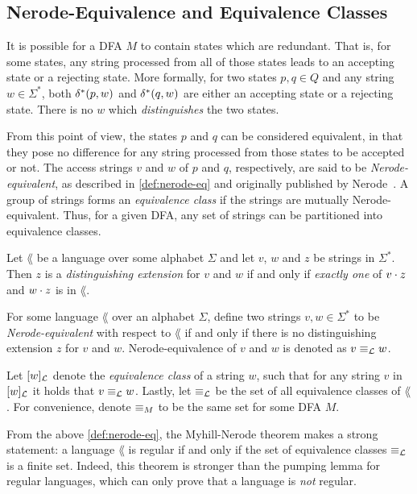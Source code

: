 \subsection{Nerode-Equivalence and Equivalence Classes}
\label{sec:nerode-equiv-equiv}
It is possible for a DFA $M$ to contain states which are redundant. That is, for
some states, any string processed from all of those states leads to an accepting
state or a rejecting state. More formally, for two states $p,q \in Q$ and any
string $w \in \Sigma^*$, both $\delta^*(p,w)$ and $\delta^*(q,w)$ are either an
accepting state or a rejecting state. There is no $w$ which
\textit{distinguishes} the two states.

From this point of view, the states $p$ and $q$ can be considered equivalent, in
that they pose no difference for any string processed from those states to be
accepted or not. The access strings $v$ and $w$ of $p$ and $q$, respectively,
are said to be \textit{Nerode-equivalent}, as described in \cref{def:nerode-eq}
and originally published by Nerode~\cite{Nerode1958}. A group of strings forms an
\textit{equivalence class} if the strings are mutually Nerode-equivalent. Thus,
for a given DFA, any set of strings can be partitioned into equivalence classes.

\begin{definition}\label{def:dist-ext}
  Let $\lang$ be a language over some alphabet $\Sigma$ and let $v$, $w$ and
  $z$ be strings in $\Sigma^*$. Then $z$ is a \textit{distinguishing extension}
  for $v$ and $w$ if and only if \textit{exactly one} of $v \cdot z$ and
  $w \cdot z$ is in $\lang$.
\end{definition}
\begin{definition}\label{def:nerode-eq}
  For some language $\lang$ over an alphabet $\Sigma$, define two strings
  $v,w \in \Sigma^*$ to be \textit{Nerode-equivalent} with respect to $\lang$ if
  and only if there is no distinguishing extension $z$ for $v$ and $w$.
  Nerode-equivalence of $v$ and $w$ is denoted as $v \equiv_{\mathcal{L}} w$.

  Let $[w]_{\mathcal{L}}$ denote the \textit{equivalence class} of a string
  $w$, such that for any string $v$ in $[w]_{\mathcal{L}}$ it holds that
  $v \equiv_{\mathcal{L}} w$. Lastly, let $\equiv_{\mathcal{L}}$ be the set of all equivalence
  classes of $\lang$. For convenience, denote $\equiv_M$ to be the same set for
  some DFA $M$.
\end{definition}

From the above \cref{def:nerode-eq}, the Myhill-Nerode theorem makes a strong
statement: a language $\lang$ is regular if and only if the set of equivalence
classes $\equiv_{\mathcal{L}}$ is a finite set. Indeed, this theorem is stronger than the
pumping lemma for regular languages, which can only prove that a language is
\textit{not} regular.

